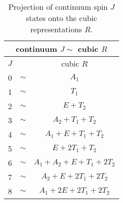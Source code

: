 \documentclass[12pt]{article}
\begin{document}
\begin{table}[htb]
\centering
\begin{tabular}{|ccc|} \hline
\multicolumn{3}{|c|}{continuum $J \sim$ cubic $R$} \\ \hline
$J$    &        &  cubic $R$  \\  \hline
 0   & $\sim$ & $A_1$   \\
 1   & $\sim$ & $T_1$      \\
 2   & $\sim$ & $E+T_2$     \\
 3   & $\sim$ & $A_2+T_1+T_2$     \\
 4   & $\sim$ & $A_1+E+T_1+T_2$     \\
 5   & $\sim$ & $E+2T_1+T_2$      \\
 6   & $\sim$ & $A_1+A_2+E+T_1+2T_2$     \\
 7   & $\sim$ & $A_2+E+2T_1+2T_2$     \\
 8   & $\sim$ & $A_1+2E+2T_1+2T_2$     \\ \hline
\end{tabular}
\caption{Projection of continuum spin $J$ states onto the cubic representations $R$.}
\label{table_J_R}
\end{table}
\end{document}

